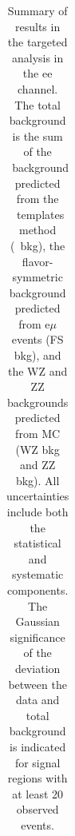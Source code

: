 \begin{table}[htb]
\begin{center}
\footnotesize
\caption{\label{tab:results_targ_ee}\footnotesize Summary of results in the targeted analysis in the ee channel. The total background is the sum of the \zjets\ background predicted from
the \MET\ templates method (\zjets\ bkg), the flavor-symmetric background predicted from e$\mu$ events (FS bkg), and the WZ and ZZ backgrounds predicted from MC
(WZ bkg and ZZ bkg). All uncertainties include both the statistical and systematic components. The Gaussian significance of the deviation between the data 
and total background is indicated for signal regions with at least 20 observed events. }
\begin{tabular}{l|c|c|c|c}



\end{tabular}
\end{center}
\end{table}
